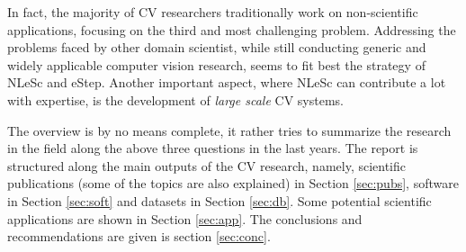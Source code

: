 In fact, the majority of CV researchers traditionally work on non-scientific applications, focusing on the third and most challenging problem. Addressing the problems faced by other domain scientist, while still conducting generic and widely applicable computer vision research, seems to fit best the strategy of NLeSc and eStep. Another important aspect, where NLeSc can contribute a lot with expertise, is the development of {\em large scale} CV systems.

The overview is by no means complete, it rather tries to summarize the research in the field along the above three questions in the last years. The report is structured along the main outputs of the CV research, namely, scientific publications (some of the topics are also explained) in Section \ref{sec:pubs}, software in Section \ref{sec:soft} and datasets in Section \ref{sec:db}. Some potential scientific applications are shown in Section \ref{sec:app}. The conclusions and recommendations are given is section \ref{sec:conc}.